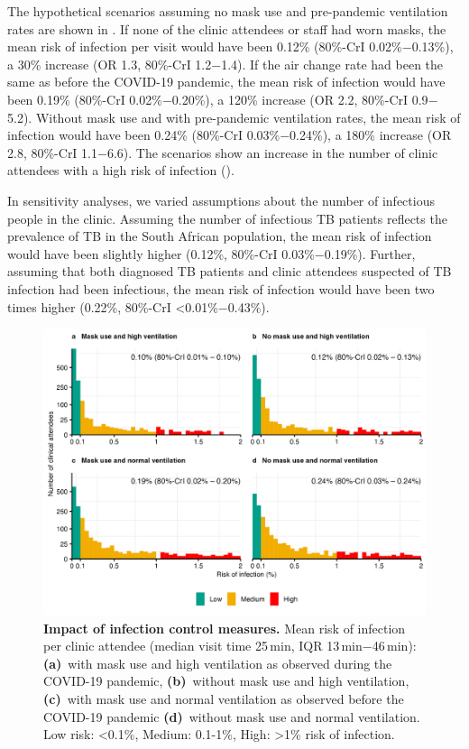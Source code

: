 \documentclass[fleqn,11pt]{wlscirep}
\begin{document}
The hypothetical scenarios assuming no mask use and pre-pandemic ventilation rates are shown in  . If none of the clinic attendees or staff had worn masks, the mean risk of infection per visit would have been 0.12\% (80\%-CrI 0.02\%$-$0.13\%), a 30\% increase (OR 1.3, 80\%-CrI 1.2$-$1.4). If the air change rate had been the same as before the COVID-19 pandemic, the mean risk of infection would have been 0.19\% (80\%-CrI 0.02\%$-$0.20\%), a 120\% increase (OR 2.2, 80\%-CrI 0.9$-$5.2). Without mask use and with pre-pandemic ventilation rates, the mean risk of infection would have been 0.24\% (80\%-CrI 0.03\%$-$0.24\%), a 180\% increase (OR 2.8, 80\%-CrI 1.1$-$6.6). The scenarios show an increase in the number of clinic attendees with a high risk of infection (). 

In sensitivity analyses, we varied assumptions about the number of infectious people in the clinic. Assuming the number of infectious TB patients reflects the prevalence of TB in the South African population, the mean risk of infection would have been slightly higher (0.12\%, 80\%-CrI 0.03\%$-$0.19\%). Further, assuming that both diagnosed TB patients and clinic attendees suspected of TB infection had been infectious, the mean risk of infection would have been two times higher (0.22\%, 80\%-CrI <0.01\%$-$0.43\%).  

\begin{figure}
    \centering
    \includegraphics{results/modeling/mean-roi-comparison.png}
    \caption{\textbf{Impact of infection control measures.} Mean risk of infection per clinic attendee (median visit time 25\,min, IQR 13\,min$-$46\,min): \textbf{(a)}~with mask use and high ventilation as observed during the COVID-19 pandemic, \textbf{(b)}~without mask use and high ventilation, \textbf{(c)}~with mask use and normal ventilation as observed before the COVID-19 pandemic  \textbf{(d)}~without mask use and normal ventilation. Low risk: <0.1\%, Medium: 0.1-1\%, High: >1\% risk of infection.}
    \label{fig:scenario-results}
\end{figure}
\end{document}
